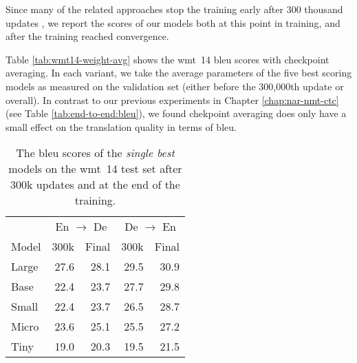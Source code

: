 Since many of the related approaches stop the training early after 300 thousand
updates \citep{gu2017nonautoregressive, gu-kong-2021-fully}, we report the
scores of our models both at this point in training, and after the training
reached convergence.

Table \ref{tab:wmt14-weight-avg} shows the \acs{wmt}~14 \acs{bleu} scores with
checkpoint averaging. In each variant, we take the average parameters of the
five best scoring models as measured on the validation set (either before the
300,000th update or overall). In contrast to our previous experiments in
Chapter \ref{chap:nar-nmt-ctc} (see Table \ref{tab:end-to-end:bleu}), we found
chekpoint averaging does only have a small effect on the translation quality in
terms of \acs{bleu}.

\begin{table}
  \centering
  \begin{tabular}{lrrrr}
    \toprule
    & \multicolumn{2}{c}{En $\rightarrow$ De}
    & \multicolumn{2}{c}{De $\rightarrow$ En} \\
    Model
    & 300k & Final & 300k &  Final \\
    \midrule

    Large & 27.6 & 28.1 & 29.5 & 30.9 \\
    Base  & 22.4 & 23.7 & 27.7 & 29.8 \\
    Small & 22.4 & 23.7 & 26.5 & 28.7 \\
    Micro & 23.6 & 25.1 & 25.5 & 27.2 \\
    Tiny  & 19.0 & 20.3 & 19.5 & 21.5 \\

    \bottomrule
  \end{tabular}

  \caption{The \acs{bleu} scores of the \emph{single best} models on the
    \acs{wmt}~14 test set after 300k updates and at the end of the training.}%
  \label{tab:wmt14-bleu-scores}
\end{table}

